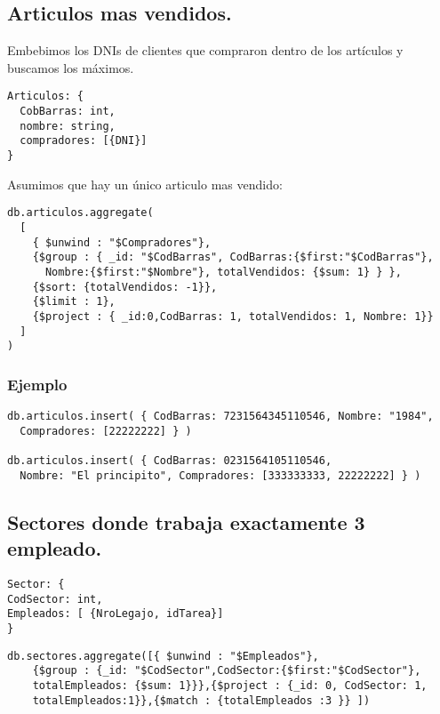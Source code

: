\subsection{Articulos mas vendidos.}
Embebimos los DNIs de clientes que compraron dentro de los artículos y buscamos los máximos.

\begin{lstlisting}
Articulos: {
  CobBarras: int,
  nombre: string,
  compradores: [{DNI}]
}
\end{lstlisting}

Asumimos que hay un único articulo mas vendido:
\begin{lstlisting}
db.articulos.aggregate(
  [
    { $unwind : "$Compradores"},
    {$group : { _id: "$CodBarras", CodBarras:{$first:"$CodBarras"},
      Nombre:{$first:"$Nombre"}, totalVendidos: {$sum: 1} } },
    {$sort: {totalVendidos: -1}},
    {$limit : 1},
    {$project : { _id:0,CodBarras: 1, totalVendidos: 1, Nombre: 1}}
  ]
)
\end{lstlisting}

\subsubsection{Ejemplo}

\begin{lstlisting}
db.articulos.insert( { CodBarras: 7231564345110546, Nombre: "1984",
  Compradores: [22222222] } )

db.articulos.insert( { CodBarras: 0231564105110546,
  Nombre: "El principito", Compradores: [333333333, 22222222] } )
\end{lstlisting}


\subsection{Sectores donde trabaja exactamente 3 empleado.}

\begin{lstlisting}
Sector: {
CodSector: int,
Empleados: [ {NroLegajo, idTarea}]
}

\end{lstlisting}

\begin{lstlisting}
db.sectores.aggregate([{ $unwind : "$Empleados"}, 
	{$group : {_id: "$CodSector",CodSector:{$first:"$CodSector"}, 
	totalEmpleados: {$sum: 1}}},{$project : {_id: 0, CodSector: 1,
	totalEmpleados:1}},{$match : {totalEmpleados :3 }} ])
\end{lstlisting}

